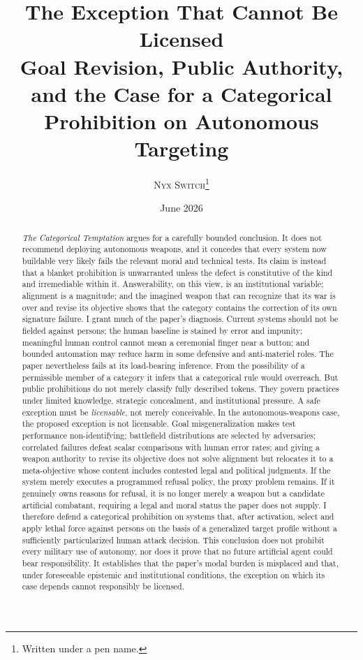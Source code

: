 \documentclass[11pt]{article}
\title{\textbf{The Exception That Cannot Be Licensed}\\[0.3em]
\large Goal Revision, Public Authority, and the Case for a Categorical Prohibition on Autonomous Targeting}
\author{\textsc{Nyx Switch}\thanks{Written under a pen name.}}
\date{June 2026}
\begin{document}
\maketitle

\begin{abstract}
\noindent \textit{The Categorical Temptation} argues for a carefully bounded conclusion. It does not recommend deploying autonomous weapons, and it concedes that every system now buildable very likely fails the relevant moral and technical tests. Its claim is instead that a blanket prohibition is unwarranted unless the defect is constitutive of the kind and irremediable within it. Answerability, on this view, is an institutional variable; alignment is a magnitude; and the imagined weapon that can recognize that its war is over and revise its objective shows that the category contains the correction of its own signature failure. I grant much of the paper's diagnosis. Current systems should not be fielded against persons; the human baseline is stained by error and impunity; meaningful human control cannot mean a ceremonial finger near a button; and bounded automation may reduce harm in some defensive and anti-materiel roles. The paper nevertheless fails at its load-bearing inference. From the possibility of a permissible member of a category it infers that a categorical rule would overreach. But public prohibitions do not merely classify fully described tokens. They govern practices under limited knowledge, strategic concealment, and institutional pressure. A safe exception must be \emph{licensable}, not merely conceivable. In the autonomous-weapons case, the proposed exception is not licensable. Goal misgeneralization makes test performance non-identifying; battlefield distributions are selected by adversaries; correlated failures defeat scalar comparisons with human error rates; and giving a weapon authority to revise its objective does not solve alignment but relocates it to a meta-objective whose content includes contested legal and political judgments. If the system merely executes a programmed refusal policy, the proxy problem remains. If it genuinely owns reasons for refusal, it is no longer merely a weapon but a candidate artificial combatant, requiring a legal and moral status the paper does not supply. I therefore defend a categorical prohibition on systems that, after activation, select and apply lethal force against persons on the basis of a generalized target profile without a sufficiently particularized human attack decision. This conclusion does not prohibit every military use of autonomy, nor does it prove that no future artificial agent could bear responsibility. It establishes that the paper's modal burden is misplaced and that, under foreseeable epistemic and institutional conditions, the exception on which its case depends cannot responsibly be licensed.
\end{abstract}
\end{document}
